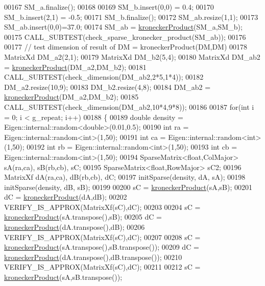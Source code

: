 \begin{DoxyCode}
00167   SM\_a.finalize();
00168   
00169   SM\_b.insert(0,0) =  0.4;
00170   SM\_b.insert(2,1) = -0.5;
00171   SM\_b.finalize();
00172   SM\_ab.resize(1,1);
00173   SM\_ab.insert(0,0)=37.0;
00174   SM\_ab = \hyperlink{namespace_eigen_aedd4b7cd1e324ed0769cac2701f4d050}{kroneckerProduct}(SM\_a,SM\_b);
00175   CALL\_SUBTEST(check\_sparse\_kronecker\_product(SM\_ab));
00176 
00177   \textcolor{comment}{// test dimension of result of DM = kroneckerProduct(DM,DM)}
00178   MatrixXd DM\_a2(2,1);
00179   MatrixXd DM\_b2(5,4);
00180   MatrixXd DM\_ab2 = \hyperlink{namespace_eigen_aedd4b7cd1e324ed0769cac2701f4d050}{kroneckerProduct}(DM\_a2,DM\_b2);
00181   CALL\_SUBTEST(check\_dimension(DM\_ab2,2*5,1*4));
00182   DM\_a2.resize(10,9);
00183   DM\_b2.resize(4,8);
00184   DM\_ab2 = \hyperlink{namespace_eigen_aedd4b7cd1e324ed0769cac2701f4d050}{kroneckerProduct}(DM\_a2,DM\_b2);
00185   CALL\_SUBTEST(check\_dimension(DM\_ab2,10*4,9*8));
00186   
00187   \textcolor{keywordflow}{for}(\textcolor{keywordtype}{int} i = 0; i < g\_repeat; i++)
00188   \{
00189     \textcolor{keywordtype}{double} density = Eigen::internal::random<double>(0.01,0.5);
00190     \textcolor{keywordtype}{int} ra = Eigen::internal::random<int>(1,50);
00191     \textcolor{keywordtype}{int} ca = Eigen::internal::random<int>(1,50);
00192     \textcolor{keywordtype}{int} rb = Eigen::internal::random<int>(1,50);
00193     \textcolor{keywordtype}{int} cb = Eigen::internal::random<int>(1,50);
00194     SparseMatrix<float,ColMajor> sA(ra,ca), sB(rb,cb), sC;
00195     SparseMatrix<float,RowMajor> sC2;
00196     MatrixXf dA(ra,ca), dB(rb,cb), dC;
00197     initSparse(density, dA, sA);
00198     initSparse(density, dB, sB);
00199     
00200     sC = \hyperlink{namespace_eigen_aedd4b7cd1e324ed0769cac2701f4d050}{kroneckerProduct}(sA,sB);
00201     dC = \hyperlink{namespace_eigen_aedd4b7cd1e324ed0769cac2701f4d050}{kroneckerProduct}(dA,dB);
00202     VERIFY\_IS\_APPROX(MatrixXf(sC),dC);
00203     
00204     sC = \hyperlink{namespace_eigen_aedd4b7cd1e324ed0769cac2701f4d050}{kroneckerProduct}(sA.transpose(),sB);
00205     dC = \hyperlink{namespace_eigen_aedd4b7cd1e324ed0769cac2701f4d050}{kroneckerProduct}(dA.transpose(),dB);
00206     VERIFY\_IS\_APPROX(MatrixXf(sC),dC);
00207     
00208     sC = \hyperlink{namespace_eigen_aedd4b7cd1e324ed0769cac2701f4d050}{kroneckerProduct}(sA.transpose(),sB.transpose());
00209     dC = \hyperlink{namespace_eigen_aedd4b7cd1e324ed0769cac2701f4d050}{kroneckerProduct}(dA.transpose(),dB.transpose());
00210     VERIFY\_IS\_APPROX(MatrixXf(sC),dC);
00211     
00212     sC = \hyperlink{namespace_eigen_aedd4b7cd1e324ed0769cac2701f4d050}{kroneckerProduct}(sA,sB.transpose());

\end{DoxyCode}
